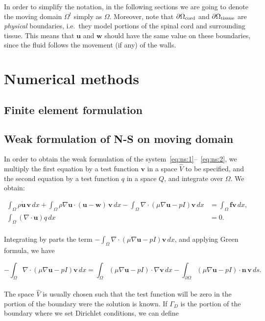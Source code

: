 \documentclass[11pt,a4paper,titlepage]{report}
\begin{document}
In order to simplify the notation, in the following sections we are going to denote the moving domain $\Omega^t$ simply as $\Omega$. Moreover, note that $\partial \Omega_{\rm cord}$ and $\partial \Omega_{\rm
  tissue}$ are \textit{physical} boundaries, i.e.~they model portions
of the spinal cord and surrounding tissue. This means that
$\mathbf{u}$ and $\mathbf{w}$ should have the same value on these
boundaries, since the fluid follows the movement (if any) of the
walls.



\chapter{Numerical methods}

\section{Finite element formulation}

\section{Weak formulation of N-S on moving domain}
In order to obtain the weak formulation of the system~\eqref{eq:ns:1}--~\eqref{eq:ns:2}, we multiply the first equation by a test function $\mathbf{v}$ in a space $\hat{V}$ to be specified, and the second equation by a test function $q$ in a space $Q$, and integrate over $\Omega$. 
We obtain:

\begin{align}
\int_{\Omega} \rho \dot{\mathbf{u}} \, \mathbf{v} \, dx
+ \int_{\Omega} \rho \nabla \mathbf{u} \cdot (\mathbf{u} - \mathbf{w}) \, \mathbf{v} \, dx
- \int_{\Omega} \nabla \cdot (\mu \nabla \mathbf{u} - pI)\mathbf{v} \, dx
&= \int_{\Omega} \mathbf{f} \mathbf{v} \, dx, \\
\int_{\Omega}  (\nabla \cdot \mathbf{u}) q \, dx &= 0.
\end{align}
\\
Integrating by parts the term $- \int_{\Omega} \nabla \cdot (\mu \nabla \mathbf{u} - pI)\mathbf{v} \, dx$, and applying Green formula, we have

\[
- \int_{\Omega} \nabla \cdot (\mu \nabla \mathbf{u} - pI)\mathbf{v} \, dx =  \int_{\Omega} (\mu \nabla \mathbf{u} - pI) \cdot \nabla \mathbf{v} \, dx - \int_{\partial \Omega} (\mu \nabla \mathbf{u} - pI) \cdot \mathbf{n} \, \mathbf{v} \, ds.
\]
\\
The space $\hat{V}$ is usually chosen such that the test function will be zero in the portion of the boundary were the solution is known. If $\Gamma_D$ is the portion of the boundary where we set Dirichlet conditions, we can define
\end{document}
